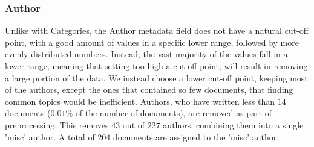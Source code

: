 \subsubsection{Author}\label{subsec:appendix_author}
Unlike with Categories, the Author metadata field does not have a natural cut-off point, with a good amount of values in a specific lower range, followed by more evenly distributed numbers.
Instead, the vast majority of the values fall in a lower range, meaning that setting too high a cut-off point, will result in removing a large portion of the data.
We instead choose a lower cut-off point, keeping most of the authors, except the ones that contained so few documents, that finding common topics would be inefficient.
Authors, who have written less than $14$ documents ($0.01\%$ of the number of documents), are removed as part of preprocessing.
This removes $43$ out of $227$ authors, combining them into a single 'misc' author.
A total of $204$ documents are assigned to the 'misc' author.

